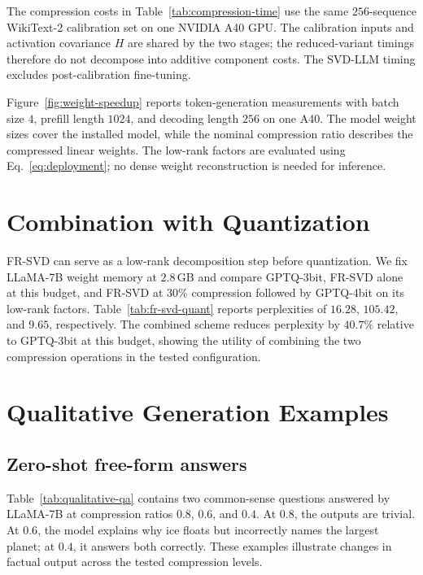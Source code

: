 The compression costs in Table~\ref{tab:compression-time} use the same $256$-sequence WikiText-2 calibration set on one NVIDIA A40 GPU. The calibration inputs and activation covariance $H$ are shared by the two stages; the reduced-variant timings therefore do not decompose into additive component costs. The SVD-LLM timing excludes post-calibration fine-tuning.

Figure~\ref{fig:weight-speedup} reports token-generation measurements with batch size $4$, prefill length $1024$, and decoding length $256$ on one A40. The model weight sizes cover the installed model, while the nominal compression ratio describes the compressed linear weights. The low-rank factors are evaluated using Eq.~\eqref{eq:deployment}; no dense weight reconstruction is needed for inference.

\section{Combination with Quantization}\label{app:quantization}
FR-SVD can serve as a low-rank decomposition step before quantization. We fix LLaMA-7B weight memory at $2.8$\,GB and compare GPTQ-3bit, FR-SVD alone at this budget, and FR-SVD at $30\%$ compression followed by GPTQ-4bit on its low-rank factors. Table~\ref{tab:fr-svd-quant} reports perplexities of $16.28$, $105.42$, and $9.65$, respectively. The combined scheme reduces perplexity by $40.7\%$ relative to GPTQ-3bit at this budget, showing the utility of combining the two compression operations in the tested configuration.



\section{Qualitative Generation Examples}\label{app:qualitative}

\subsection{Zero-shot free-form answers}
Table~\ref{tab:qualitative-qa} contains two common-sense questions answered by LLaMA-7B at compression ratios $0.8$, $0.6$, and $0.4$. At $0.8$, the outputs are trivial. At $0.6$, the model explains why ice floats but incorrectly names the largest planet; at $0.4$, it answers both correctly. These examples illustrate changes in factual output across the tested compression levels.

